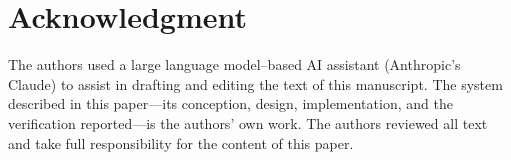 \documentclass[conference]{IEEEtran}
\begin{document}
\section*{Acknowledgment}
The authors used a large language model--based AI assistant (Anthropic's
Claude) to assist in drafting and editing the text of this manuscript. The
system described in this paper---its conception, design, implementation, and
the verification reported---is the authors' own work. The authors reviewed
all text and take full responsibility for the content of this paper.

\end{document}
